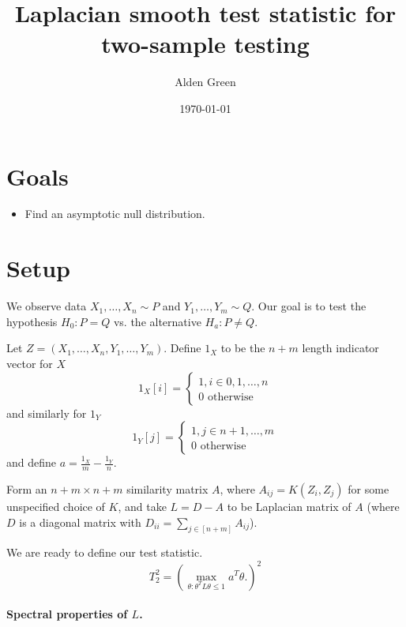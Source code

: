 \documentclass{article}
\theoremstyle{alden}
\theoremstyle{definition}
\theoremstyle{remark}
\begin{document}
	
\title{Laplacian smooth test statistic for two-sample testing}
\author{Alden Green}
\date{\today}
\maketitle

\section{Goals}
\begin{itemize}
	\item Find an asymptotic null distribution.
\end{itemize}

\section{Setup}

We observe data $X_1, \ldots, X_n \sim P$ and $Y_1, \ldots, Y_m \sim Q$. Our goal is to test the hypothesis $H_0: P = Q$ vs. the alternative $H_a: P \neq Q$. 

Let $Z  = (X_1, \ldots, X_n, Y_1, \ldots, Y_m)$. Define $1_X$ to be the $n + m$ length indicator vector for $X$
\begin{equation*}
1_X[i] = 
\begin{cases}
1, i \in 0, 1, \ldots, n \\
0 \text{ otherwise } 
\end{cases}
\end{equation*}
and similarly for $1_Y$
\begin{equation*}
1_Y[j] = 
\begin{cases}
1, j \in n + 1, \ldots, m \\
0 \text{ otherwise } 
\end{cases}
\end{equation*}
and define $a = \frac{1_X}{m} - \frac{1_Y}{n}$. 

Form an $n + m \times n + m$ similarity matrix $A$, where $A_{ij} = K(Z_i, Z_j)$ for some unspecified choice of $K$, and take $L = D - A$ to be Laplacian matrix of $A$ (where $D$ is a diagonal matrix with $D_{ii} = \sum_{j \in [n + m]} A_{ij}$).

We are ready to define our test statistic. 
\begin{equation*}
T_2^2 = \left(\max_{\theta: \theta^T L \theta \leq 1} a^T \theta. \right)^2
\end{equation*}

\paragraph{Spectral properties of $L$.}
\end{document}
